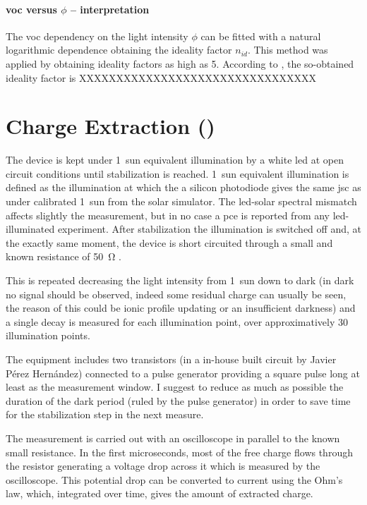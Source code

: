 \paragraph{\Gls{voc} versus $\phi$ -- interpretation} The \gls{voc} dependency on the light intensity $\phi$ can be fitted with a natural logarithmic dependence obtaining the ideality factor $n_{id}$. This method was applied by  obtaining ideality factors as high as 5. According to , the so-obtained ideality factor is XXXXXXXXXXXXXXXXXXXXXXXXXXXXXXXX

\section{Charge Extraction ()}

The device is kept under 1~sun equivalent illumination by a white \gls{led} at open circuit conditions until stabilization is reached. 1~sun equivalent illumination is defined as the illumination at which the a silicon photodiode gives the same \gls{jsc} as under calibrated 1~sun from the solar simulator. The \gls{led}-solar spectral mismatch affects slightly the measurement, but in no case a \gls{pce} is reported from any \gls{led}-illuminated experiment. After stabilization the illumination is switched off and, at the exactly same moment, the device is short circuited through a small and known resistance of \SI{50}{\ohm} \cite{Duffy2000}.

This is repeated decreasing the light intensity from 1~sun down to dark (in dark no signal should be observed, indeed some residual charge can usually be seen, the reason of this could be ionic profile updating or an insufficient darkness) and a single decay is measured for each illumination point, over approximatively 30 illumination points.

The equipment includes two transistors (in a in-house built circuit by Javier Pérez Hernández) connected to a pulse generator providing a square pulse long at least as the measurement window. I suggest to reduce as much as possible the duration of the dark period (ruled by the pulse generator) in order to save time for the stabilization step in the next measure.

The measurement is carried out with an oscilloscope in parallel to the known small resistance. In the first microseconds, most of the free charge flows through the resistor generating a voltage drop across it which is measured by the oscilloscope. This potential drop can be converted to current using the Ohm's law, which, integrated over time, gives the amount of extracted charge.

